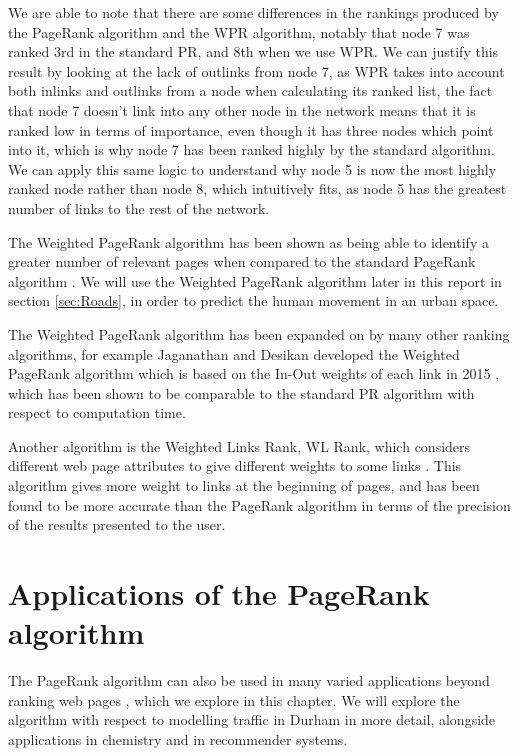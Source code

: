 \documentclass[11pt]{report}
\begin{document}
We are able to note that there are some differences in the rankings produced by the PageRank algorithm and the WPR algorithm, notably that node 7 was ranked 3rd in the standard PR, and 8th when we use WPR. We can justify this result by looking at the lack of outlinks from node 7, as WPR takes into account both inlinks and outlinks from a node when calculating its ranked list, the fact that node 7 doesn't link into any other node in the network means that it is ranked low in terms of importance, even though it has three nodes which point into it, which is why node 7 has been ranked highly by the standard algorithm. We can apply this same logic to understand why node 5 is now the most highly ranked node rather than node 8, which intuitively fits, as node 5 has the greatest number of links to the rest of the network. 

The Weighted PageRank algorithm has been shown as being able to identify a greater number of relevant pages when compared to the standard PageRank algorithm \cite{xing2004weighted}. We will use the Weighted PageRank algorithm later in this report in section \ref{sec:Roads}, in order to predict the human movement in an urban space.

The Weighted PageRank algorithm has been expanded on by many other ranking algorithms, for example Jaganathan and Desikan developed the Weighted PageRank algorithm which is based on the In-Out weights of each link in 2015 \cite{jaganathan2015weighted}, which has been shown to be comparable to the standard PR algorithm with respect to computation time. 

Another algorithm is the Weighted Links Rank, WL Rank, which considers different web page attributes to give different weights to some links \cite{baeza2004web}. This algorithm gives more weight to links at the beginning of pages, and has been found to be more accurate than the PageRank algorithm in terms of the precision of the results presented to the user.

\chapter{Applications of the PageRank algorithm} \label{chap:Applications}
The PageRank algorithm can also be used in many varied applications beyond ranking web pages \cite{gleich2015pagerank}, which we explore in this chapter. We will explore the algorithm with respect to modelling traffic in Durham in more detail, alongside applications in chemistry and in recommender systems. 
\end{document}
